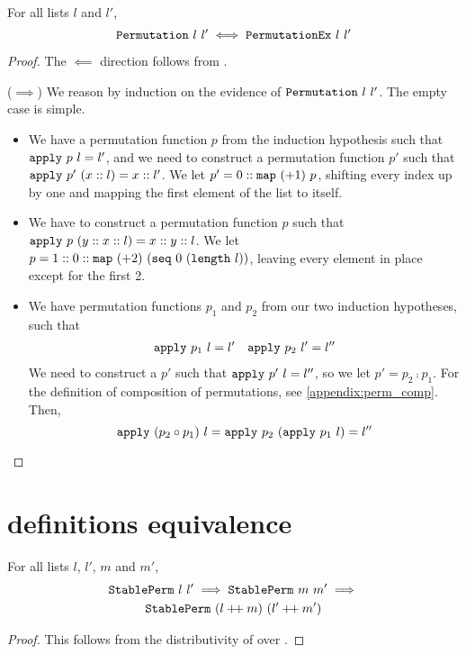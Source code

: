 \documentclass[sigplan,10pt,anonymous,review]{thesis}
\begin{document}
\begin{theorem}
  \label{thm:permutationex_iff}
  For all lists $l$ and $l'$,
  \begin{equation*}
    \texttt{\textup{Permutation}}~l~l' \iff \texttt{\textup{PermutationEx}}~l~l'
  \end{equation*}
\end{theorem}
\begin{proof}
  The $\impliedby$ direction follows from .

  ($\implies$) We reason by induction on the evidence of
  $\texttt{\textup{Permutation}}~l~l'$. The empty case is simple.
  \begin{itemize}
  \item We have a permutation function $p$ from the induction
    hypothesis such that $\texttt{\textup{apply}}~p~l = l'$, and we need to
    construct a permutation function $p'$ such that
    $\texttt{\textup{apply}}~p'~(x::l) = x :: l'$. We let $p' = 0 ::
    \texttt{\textup{map}}~(+1)~p$, shifting every index up by one and mapping
    the first element of the list to itself.
  \item We have to construct a permutation function $p$ such that
    $\texttt{\textup{apply}}~p~(y :: x :: l) = x :: y :: l$. We let $p = 1 :: 0 ::
    \texttt{\textup{map}}~(+2)~(\texttt{\textup{seq}}~0~(\texttt{\textup{length}}~l))$, leaving every
    element in place except for the first 2.
  \item We have permutation functions $p_1$ and $p_2$ from our two
    induction hypotheses, such that
    \begin{align*}
      \texttt{\textup{apply}}~p_1~l = l' && \texttt{\textup{apply}}~p_2~l' = l''
    \end{align*}
    We need to construct a $p'$ such that $\texttt{\textup{apply}}~p'~l=l''$, so
    we let $p' = p_2 \comp p_1$. For the definition of composition of
    permutations, see \cref{appendix:perm_comp}. Then,
    \begin{equation*}
      \texttt{\textup{apply}}~(p_2 \circ p_1)~l =
      \texttt{\textup{apply}}~p_2~(\texttt{\textup{apply}}~p_1~l) = l'' \qedhere
    \end{equation*}
  \end{itemize}
\end{proof}

\section{ definitions equivalence}
\label{appendix:stableperm_def_eq}

\begin{lemma}
  For all lists $l$, $l'$, $m$ and $m'$,
  \begin{gather*}
    \texttt{\textup{StablePerm}}~l~l' \implies \texttt{\textup{StablePerm}}~m~m' \implies \\
    \texttt{\textup{StablePerm}}~(l \mathbin{+\mkern-3mu+} m)~(l' \mathbin{+\mkern-3mu+} m')
  \end{gather*}
\end{lemma}
\begin{proof}
  This follows from the distributivity of  over .
\end{proof}
\end{document}
